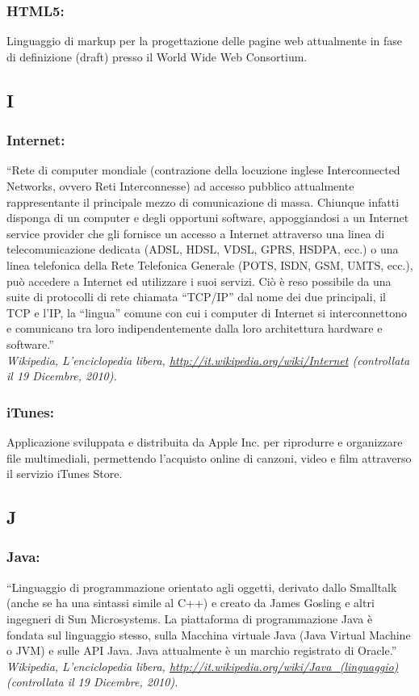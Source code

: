 \subsubsection*{HTML5:} Linguaggio di markup per la progettazione delle pagine
web attualmente in fase di definizione (draft) presso il World Wide Web Consortium.

\subsection*{\huge{I}}
\subsubsection*{Internet:}  ``Rete di computer mondiale (contrazione della
locuzione inglese Interconnected Networks, ovvero Reti Interconnesse) ad accesso pubblico
attualmente rappresentante il principale mezzo di comunicazione di massa.
Chiunque infatti disponga di un computer e degli opportuni software,
appoggiandosi a un Internet service provider che gli fornisce un accesso a
Internet attraverso una linea di telecomunicazione dedicata (ADSL, HDSL, VDSL,
GPRS, HSDPA, ecc.) o una linea telefonica della Rete Telefonica Generale (POTS,
ISDN, GSM, UMTS, ecc.), pu\`o accedere a Internet ed utilizzare i suoi servizi.
Ci\`o \`e reso possibile da una suite di protocolli di rete chiamata ``TCP/IP'' dal
nome dei due principali, il TCP e l'IP, la ``lingua'' comune con cui i computer
di Internet si interconnettono e comunicano tra loro indipendentemente dalla loro
architettura hardware e software.'' \\
\emph{Wikipedia, L'enciclopedia libera,
\url{http://it.wikipedia.org/wiki/Internet} (controllata il 19 Dicembre, 2010).}

\subsubsection*{iTunes:} Applicazione sviluppata e distribuita da Apple Inc. per
riprodurre e organizzare file multimediali, permettendo l'acquisto online di canzoni, video e
film attraverso il servizio iTunes Store.

\subsection*{\huge{J}}
\subsubsection*{Java:} ``Linguaggio di programmazione orientato agli oggetti,
derivato dallo Smalltalk (anche se ha una sintassi simile al C++) e creato da
James Gosling e altri ingegneri di Sun Microsystems. La piattaforma di
programmazione Java \`e fondata sul linguaggio stesso, sulla Macchina virtuale
Java (Java Virtual Machine o JVM) e sulle API Java. Java attualmente \`e un
marchio registrato di Oracle.''\\
\emph{Wikipedia, L'enciclopedia libera,
\url{http://it.wikipedia.org/wiki/Java_(linguaggio)} (controllata il 19
Dicembre, 2010).}

